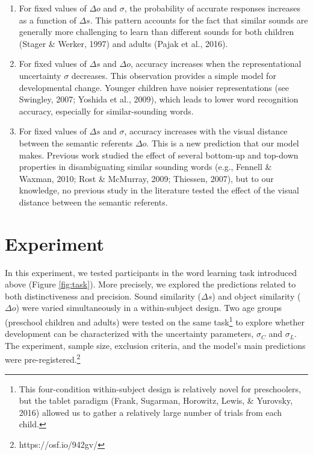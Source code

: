 \documentclass[english,,man,floatsintext]{apa6}
\let\rmarkdownfootnote\footnote%
\def\footnote{\protect\rmarkdownfootnote}
\theoremstyle{definition}
\theoremstyle{definition}
\theoremstyle{definition}
\theoremstyle{remark}
\begin{document}
\begin{enumerate}
\def\labelenumi{\arabic{enumi})}
\item
  For fixed values of \(\Delta o\) and \(\sigma\), the probability of
  accurate responses increases as a function of \(\Delta s\). This
  pattern accounts for the fact that similar sounds are generally more
  challenging to learn than different sounds for both children (Stager
  \& Werker, 1997) and adults (Pajak et al., 2016).
\item
  For fixed values of \(\Delta s\) and \(\Delta o\), accuracy increases
  when the representational uncertainty \(\sigma\) decreases. This
  observation provides a simple model for developmental change. Younger
  children have noisier representations (see Swingley, 2007; Yoshida et
  al., 2009), which leads to lower word recognition accuracy, especially
  for similar-sounding words.
\item
  For fixed values of \(\Delta s\) and \(\sigma\), accuracy increases
  with the visual distance between the semantic referents \(\Delta o\).
  This is a new prediction that our model makes. Previous work studied
  the effect of several bottom-up and top-down properties in
  disambiguating similar sounding words (e.g., Fennell \& Waxman, 2010;
  Rost \& McMurray, 2009; Thiessen, 2007), but to our knowledge, no
  previous study in the literature tested the effect of the visual
  distance between the semantic referents.
\end{enumerate}

\section{Experiment}\label{experiment}

In this experiment, we tested participants in the word learning task
introduced above (Figure \ref{fig:task}). More precisely, we explored
the predictions related to both distinctiveness and precision. Sound
similarity (\(\Delta s\)) and object similarity (\(\Delta o\)) were
varied simultaneously in a within-subject design. Two age groups
(preschool children and adults) were tested on the same task\footnote{This
  four-condition within-subject design is relatively novel for
  preschoolers, but the tablet paradigm (Frank, Sugarman, Horowitz,
  Lewis, \& Yurovsky, 2016) allowed us to gather a relatively large
  number of trials from each child.} to explore whether development can
be characterized with the uncertainty parameters, \(\sigma_C\) and
\(\sigma_L\). The experiment, sample size, exclusion criteria, and the
model's main predictions were
pre-registered.\footnote{https://osf.io/942gv/}
\end{document}
